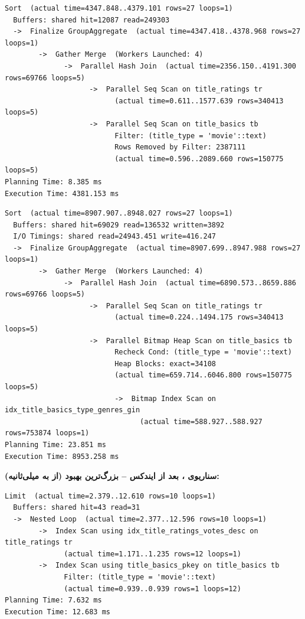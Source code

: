 \begin{latin}
\begin{lstlisting}[caption={results/explain/scenario\_01.txt -- BEFORE (excerpt)}]
Sort  (actual time=4347.848..4379.101 rows=27 loops=1)
  Buffers: shared hit=12087 read=249303
  ->  Finalize GroupAggregate  (actual time=4347.418..4378.968 rows=27 loops=1)
        ->  Gather Merge  (Workers Launched: 4)
              ->  Parallel Hash Join  (actual time=2356.150..4191.300 rows=69766 loops=5)
                    ->  Parallel Seq Scan on title_ratings tr
                          (actual time=0.611..1577.639 rows=340413 loops=5)
                    ->  Parallel Seq Scan on title_basics tb
                          Filter: (title_type = 'movie'::text)
                          Rows Removed by Filter: 2387111
                          (actual time=0.596..2089.660 rows=150775 loops=5)
Planning Time: 8.385 ms
Execution Time: 4381.153 ms
\end{lstlisting}
\begin{lstlisting}[caption={results/explain/scenario\_01.after.txt -- AFTER (excerpt)}]
Sort  (actual time=8907.907..8948.027 rows=27 loops=1)
  Buffers: shared hit=69029 read=136532 written=3892
  I/O Timings: shared read=24943.451 write=416.247
  ->  Finalize GroupAggregate  (actual time=8907.699..8947.988 rows=27 loops=1)
        ->  Gather Merge  (Workers Launched: 4)
              ->  Parallel Hash Join  (actual time=6890.573..8659.886 rows=69766 loops=5)
                    ->  Parallel Seq Scan on title_ratings tr
                          (actual time=0.224..1494.175 rows=340413 loops=5)
                    ->  Parallel Bitmap Heap Scan on title_basics tb
                          Recheck Cond: (title_type = 'movie'::text)
                          Heap Blocks: exact=34108
                          (actual time=659.714..6046.800 rows=150775 loops=5)
                          ->  Bitmap Index Scan on idx_title_basics_type_genres_gin
                                (actual time=588.927..588.927 rows=753874 loops=1)
Planning Time: 23.851 ms
Execution Time: 8953.258 ms
\end{lstlisting}
\end{latin}

\textbf{سناریوی ، بعد از ایندکس -- بزرگ‌ترین بهبود (از  به  میلی‌ثانیه):}

\begin{latin}
\begin{lstlisting}[caption={results/explain/scenario\_02.after.txt (excerpt)}]
Limit  (actual time=2.379..12.610 rows=10 loops=1)
  Buffers: shared hit=43 read=31
  ->  Nested Loop  (actual time=2.377..12.596 rows=10 loops=1)
        ->  Index Scan using idx_title_ratings_votes_desc on title_ratings tr
              (actual time=1.171..1.235 rows=12 loops=1)
        ->  Index Scan using title_basics_pkey on title_basics tb
              Filter: (title_type = 'movie'::text)
              (actual time=0.939..0.939 rows=1 loops=12)
Planning Time: 7.632 ms
Execution Time: 12.683 ms
\end{lstlisting}
\end{latin}

